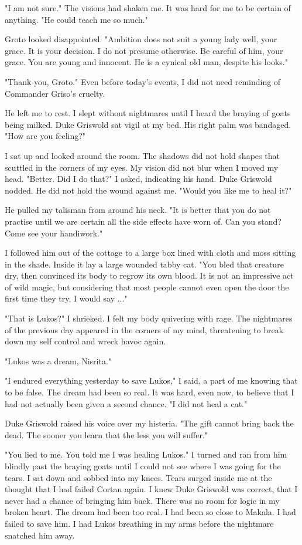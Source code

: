 \documentclass{article}
\begin{document}
"I am not sure." The visions had shaken me. It was hard for me to be certain of anything. "He could teach me so much."

Groto looked disappointed. "Ambition does not suit a young lady well, your grace. It is your decision. I do not presume otherwise. Be careful of him, your grace. You are young and innocent. He is a cynical old man, despite his looks."

"Thank you, Groto." Even before today's events, I did not need reminding of Commander Griso's cruelty.

He left me to rest. I slept without nightmares until I heard the braying of goats being milked. Duke Griswold sat vigil at my bed. His right palm was bandaged. "How are you feeling?"

I sat up and looked around the room. The shadows did not hold shapes that scuttled in the corners of my eyes. My vision did not blur when I moved my head. "Better. Did I do that?" I asked, indicating his hand. Duke Griswold nodded. He did not hold the wound against me. "Would you like me to heal it?"

He pulled my talisman from around his neck. "It is better that you do not practise until we are certain all the side effects have worn of. Can you stand? Come see your handiwork."

I followed him out of the cottage to a large box lined with cloth and moss sitting in the shade. Inside it lay a large wounded tabby cat. "You bled that creature dry, then convinced its body to regrow its own blood. It is not an impressive act of wild magic, but considering that most people cannot even open the door the first time they try, I would say ..."

"That is Lukos?" I shrieked. I felt my body quivering with rage. The nightmares of the previous day appeared in the corners of my mind, threatening to break down my self control and wreck havoc again.

"Lukos was a dream, Nisrita."

"I endured everything yesterday to save Lukos," I said, a part of me knowing that to be false. The dream had been so real. It was hard, even now, to believe that I had not actually been given a second chance. "I did not heal a cat."

Duke Griswold raised his voice over my histeria. "The gift cannot bring back the dead. The sooner you learn that the less you will suffer."

"You lied to me. You told me I was healing Lukos." I turned and ran from him blindly past the braying goats until I could not see where I was going for the tears. I sat down and sobbed into my knees. Tears surged inside me at the thought that I had failed Cortan again. I knew Duke Griswold was correct, that I never had a chance of bringing him back. There was no room for logic in my broken heart. The dream had been too real. I had been so close to Makala. I had failed to save him. I had Lukos breathing in my arms before the nightmare snatched him away. 
\end{document}
